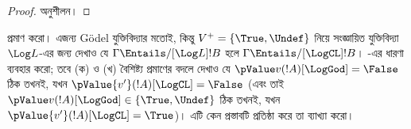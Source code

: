 \documentclass[../../../include/open-logic-section]{subfiles}
\begin{document}
\begin{proof}
  অনুশীলন।
\end{proof}

\begin{prob}
   প্রমাণ করো। এজন্য G\"odel
  যুক্তিবিদ্যার মতোই, কিন্তু $V^+=\{\True,\Undef\}$ নিয়ে সংজ্ঞায়িত
  যুক্তিবিদ্যা~$\Log L$-এর জন্য দেখাও যে
  $\Gamma \Entails/[\Log L] !B$ হলে
  $\Gamma \Entails/[\LogCL] !B$।
  -এর ধারণা ব্যবহার করো; তবে (ক) ও
  (খ) বৈশিষ্ট্য প্রমাণের বদলে দেখাও যে
  $\pValue v(!A)[\LogGod] = \False$ ঠিক তখনই, যখন
  $\pValue {v'}(!A)[\LogCL] = \False$ (এবং তাই
  $\pValue v(!A)[\LogGod] \in \{\True,\Undef\}$ ঠিক তখনই, যখন
  $\pValue {v'}(!A)[\LogCL] = \True$)। এটি কেন প্রস্তাবটি প্রতিষ্ঠা
  করে তা ব্যাখ্যা করো।
\end{prob}
\end{document}
